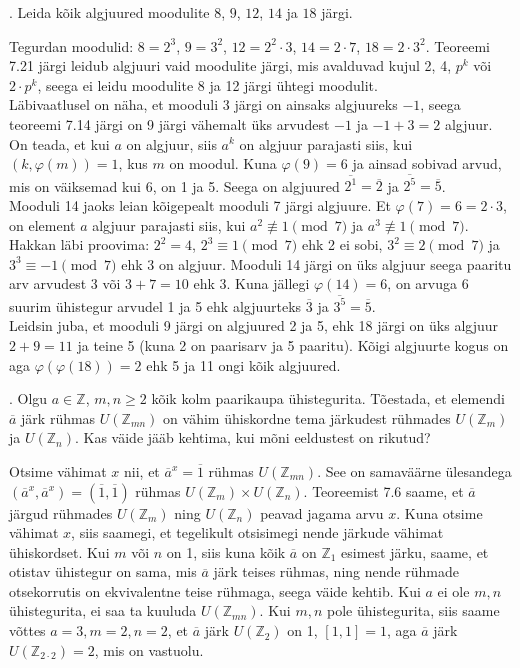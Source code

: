 \documentclass[a4paper, 10pt]{article}
\newcommand{\Z}{\mathbb{Z}}
\newcommand{\w}{\overline}
\begin{document}
. Leida kõik algjuured moodulite $8$, $9$, $12$, $14$ ja $18$ järgi. 

\bigskip
Tegurdan moodulid: $8=2^3$, $9=3^2$, $12=2^2\cdot3$, $14=2\cdot7$, $18=2\cdot3^2$. Teoreemi 7.21 järgi leidub algjuuri vaid moodulite järgi, mis avalduvad kujul 2, 4, $p^k$ või $2\cdot p^k$, seega ei leidu moodulite 8 ja 12 järgi ühtegi moodulit.\\
\indent Läbivaatlusel on näha, et mooduli 3 järgi on ainsaks algjuureks $-1$, seega teoreemi 7.14 järgi on 9 järgi vähemalt üks arvudest $-1$ ja $-1+3=2$ algjuur. On teada, et kui $a$ on algjuur, siis $a^k$ on algjuur parajasti siis, kui $(k,\varphi(m))=1$, kus $m$ on moodul. Kuna $\varphi(9)=6$ ja ainsad sobivad arvud, mis on väiksemad kui 6, on 1 ja 5. Seega on algjuured $\w{2^1}=\w2$ ja $\w{2^5}=\w5$.\\
\indent Mooduli 14 jaoks leian kõigepealt mooduli 7 järgi algjuure. Et $\varphi(7)=6=2\cdot3$, on element $a$ algjuur parajasti siis, kui $a^2\not\equiv1\pmod7$ ja $a^3\not\equiv1\pmod7$. Hakkan läbi proovima: $2^2=4$, $2^3\equiv1\pmod7$ ehk 2 ei sobi, $3^2\equiv2\pmod7$ ja $3^3\equiv-1\pmod7$ ehk 3 on algjuur. Mooduli 14 järgi on üks algjuur seega paaritu arv arvudest 3 või $3+7=10$ ehk 3. Kuna jällegi $\varphi(14)=6$, on arvuga 6 suurim ühistegur arvudel 1 ja 5 ehk algjuurteks $\w3$ ja $\w{3^5}=\w5$.\\
\indent Leidsin juba, et mooduli 9 järgi on algjuured 2 ja 5, ehk 18 järgi on üks algjuur $2+9=11$ ja teine 5 (kuna 2 on paarisarv ja 5 paaritu). Kõigi algjuurte kogus on aga $\varphi(\varphi(18))=2$ ehk 5 ja 11 ongi kõik algjuured.
\bigskip

. Olgu $a\in\Z$, $m,n\geq 2$ kõik kolm paarikaupa ühistegurita. Tõestada, et elemendi $\overline{a}$ järk rühmas $U(\Z_{mn})$ on vähim ühiskordne tema järkudest rühmades $U(\Z_{m})$ ja $U(\Z_{n})$. Kas väide jääb kehtima, kui mõni eeldustest on rikutud?

\bigskip
Otsime vähimat $x$ nii, et $\w{a}^x=\w{1}$ rühmas $ U(\Z_{mn}) $. See on samaväärne ülesandega $(\w{a}^x,\w{a}^x)=(\w{1},\w{1})$ rühmas $U(\Z_{m}) \times U(\Z_{n})$. Teoreemist 7.6 saame, et $\w{a}$ järgud rühmades $U(\Z_{m})$ ning $U(\Z_{n})$ peavad jagama arvu $x$. Kuna otsime vähimat $x$, siis saamegi, et tegelikult otsisimegi nende järkude vähimat ühiskordset. Kui $m$ või $n$ on 1, siis kuna kõik $\w{a}$ on $\Z_1$ esimest järku, saame, et otistav ühistegur on sama, mis  $\w{a}$ järk teises rühmas, ning nende rühmade otsekorrutis on ekvivalentne teise rühmaga, seega väide kehtib. Kui $a$ ei ole $m,n$ ühistegurita, ei saa ta kuuluda  $ U(\Z_{mn}) $. Kui $m,n$ pole ühistegurita, siis saame võttes $a=3,m=2,n=2$, et $\w{a}$ järk $U(\Z_2)$ on 1, $[1,1]=1$, aga $\w{a}$ järk $U(\Z_{2\cdot 2})=2$, mis on vastuolu.
\end{document}
